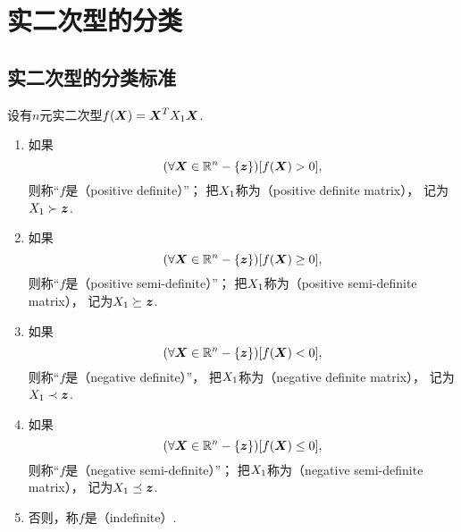 \section{实二次型的分类}
\subsection{实二次型的分类标准}
\begin{definition}\label{definition:实二次型的分类.实二次型的分类}
设有\(n\)元实二次型\(f(\boldsymbol{X}) = \boldsymbol{X}^TX_1\boldsymbol{X}\).
\begin{enumerate}
	\item 如果\[
		(\forall\boldsymbol{X}\in\mathbb{R}^n-\{\boldsymbol{z}\})
		[f(\boldsymbol{X}) > 0],
	\]
	则称“\(f\)是（positive definite）”；
	把\(X_1\)称为（positive definite matrix），
	记为\(X_1\succ\boldsymbol{z}\).

	\item 如果\[
		(\forall\boldsymbol{X}\in\mathbb{R}^n-\{\boldsymbol{z}\})
		[f(\boldsymbol{X}) \geq 0],
	\]
	则称“\(f\)是（positive semi-definite）”；
	把\(X_1\)称为（positive semi-definite matrix），
	记为\(X_1\succeq\boldsymbol{z}\).

	\item 如果\[
		(\forall\boldsymbol{X}\in\mathbb{R}^n-\{\boldsymbol{z}\})
		[f(\boldsymbol{X}) < 0],
	\]
	则称“\(f\)是（negative definite）”，
	把\(X_1\)称为（negative definite matrix），
	记为\(X_1\prec\boldsymbol{z}\).

	\item 如果\[
		(\forall\boldsymbol{X}\in\mathbb{R}^n-\{\boldsymbol{z}\})
		[f(\boldsymbol{X}) \leq 0],
	\]
	则称“\(f\)是（negative semi-definite）”；
	把\(X_1\)称为（negative semi-definite matrix），
	记为\(X_1\preceq\boldsymbol{z}\).

	\item 否则，称\(f\)是（indefinite）.
\end{enumerate}
\end{definition}

